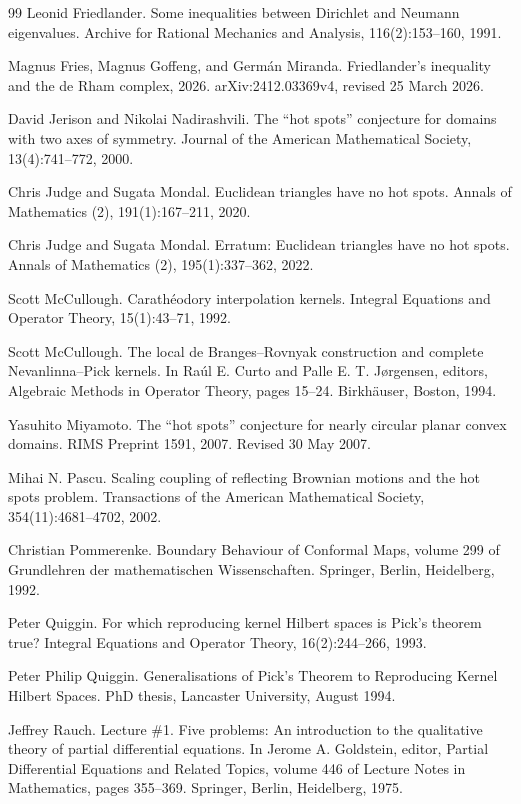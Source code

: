 \begin{thebibliography}{99}
Leonid Friedlander. Some inequalities between Dirichlet and Neumann eigenvalues. Archive for Rational Mechanics and Analysis, 116(2):153--160, 1991.

Magnus Fries, Magnus Goffeng, and Germ\'an Miranda. Friedlander's inequality and the de Rham complex, 2026. arXiv:2412.03369v4, revised 25 March 2026.

David Jerison and Nikolai Nadirashvili. The ``hot spots'' conjecture for domains with two axes of symmetry. Journal of the American Mathematical Society, 13(4):741--772, 2000.

Chris Judge and Sugata Mondal. Euclidean triangles have no hot spots. Annals of Mathematics (2), 191(1):167--211, 2020.

Chris Judge and Sugata Mondal. Erratum: Euclidean triangles have no hot spots. Annals of Mathematics (2), 195(1):337--362, 2022.

Scott McCullough. Carath\'eodory interpolation kernels. Integral Equations and Operator Theory, 15(1):43--71, 1992.

Scott McCullough. The local de Branges--Rovnyak construction and complete Nevanlinna--Pick kernels. In Raúl E. Curto and Palle E. T. Jørgensen, editors, Algebraic Methods in Operator Theory, pages 15--24. Birkhäuser, Boston, 1994.

Yasuhito Miyamoto. The ``hot spots'' conjecture for nearly circular planar convex domains. RIMS Preprint 1591, 2007. Revised 30 May 2007.

Mihai N. Pascu. Scaling coupling of reflecting Brownian motions and the hot spots problem. Transactions of the American Mathematical Society, 354(11):4681--4702, 2002.

Christian Pommerenke. Boundary Behaviour of Conformal Maps, volume 299 of Grundlehren der mathematischen Wissenschaften. Springer, Berlin, Heidelberg, 1992.

Peter Quiggin. For which reproducing kernel Hilbert spaces is Pick's theorem true? Integral Equations and Operator Theory, 16(2):244--266, 1993.

Peter Philip Quiggin. Generalisations of Pick's Theorem to Reproducing Kernel Hilbert Spaces. PhD thesis, Lancaster University, August 1994.

Jeffrey Rauch. Lecture \#1. Five problems: An introduction to the qualitative theory of partial differential equations. In Jerome A. Goldstein, editor, Partial Differential Equations and Related Topics, volume 446 of Lecture Notes in Mathematics, pages 355--369. Springer, Berlin, Heidelberg, 1975.


\end{thebibliography}
